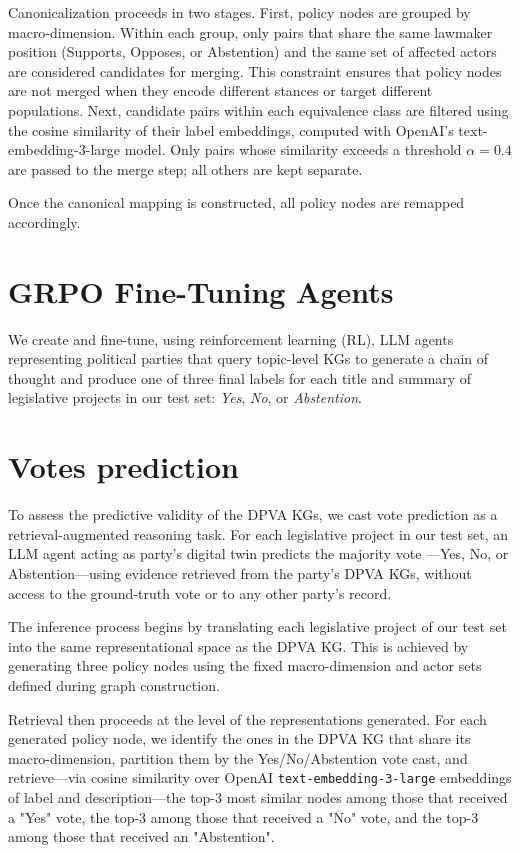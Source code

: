 \documentclass[letterpaper]{article}
\begin{document}
Canonicalization proceeds in two stages. First, policy nodes are grouped by macro-dimension. Within each group, only pairs that share the same lawmaker position (Supports, Opposes, or Abstention) and the same set of affected actors are considered candidates for merging. This constraint ensures that policy nodes are not merged when they encode different stances or target different populations. Next, candidate pairs within each equivalence class are filtered using the cosine similarity of their label embeddings, computed with OpenAI's text-embedding-3-large model. Only pairs whose similarity exceeds a threshold $\alpha = 0.4$ are passed to the merge step; all others are kept separate.

Once the canonical mapping is constructed, all policy nodes are remapped accordingly.


\section{GRPO Fine-Tuning Agents}

We create and fine-tune, using reinforcement learning (RL), LLM agents representing political parties that query topic-level KGs to generate a chain of thought and produce one of three final labels for each title and summary of legislative projects in our test set: \emph{Yes}, \emph{No}, or \emph{Abstention}.

\section{Votes prediction}

To assess the predictive validity of the DPVA KGs, we cast vote prediction as a retrieval-augmented reasoning task. For each legislative project in our test set, an LLM agent acting as party's digital twin predicts the majority vote ---Yes, No, or Abstention---using evidence retrieved from the party's DPVA KGs, without access to the ground-truth vote or to any other party's record.

The inference process begins by translating each legislative project of our test set into the same representational space as the DPVA KG. This is achieved by generating three policy nodes using the fixed macro-dimension and actor sets defined during graph construction.

Retrieval then proceeds at the level of the representations generated. For each generated policy node, we identify the ones in the DPVA KG that share its macro-dimension, partition them by the Yes/No/Abstention vote cast, and retrieve---via cosine similarity over OpenAI \texttt{text-embedding-3-large} embeddings of label and description---the top-3 most similar nodes among those that received a "Yes" vote, the top-3 among those that received a "No" vote, and the top-3 among those that received an "Abstention". 
\end{document}
